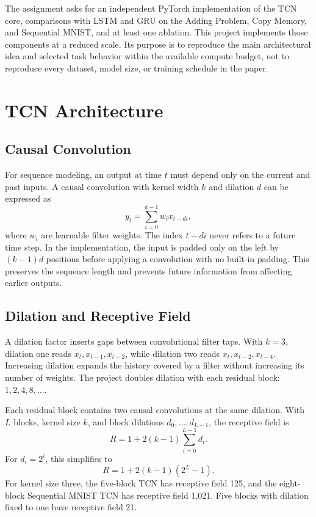 \documentclass[conference]{IEEEtran}
\begin{document}
The assignment asks for an independent PyTorch implementation of the TCN core, comparisons with LSTM and GRU on the Adding Problem, Copy Memory, and Sequential MNIST, and at least one ablation. This project implements those components at a reduced scale. Its purpose is to reproduce the main architectural idea and selected task behavior within the available compute budget, not to reproduce every dataset, model size, or training schedule in the paper.

\section{TCN Architecture}
\subsection{Causal Convolution}
For sequence modeling, an output at time $t$ must depend only on the current and past inputs. A causal convolution with kernel width $k$ and dilation $d$ can be expressed as
\begin{equation}
y_t = \sum_{i=0}^{k-1} w_i x_{t-di},
\label{eq:causal}
\end{equation}
where $w_i$ are learnable filter weights. The index $t-di$ never refers to a future time step. In the implementation, the input is padded only on the left by $(k-1)d$ positions before applying a convolution with no built-in padding. This preserves the sequence length and prevents future information from affecting earlier outputs.

\subsection{Dilation and Receptive Field}
A dilation factor inserts gaps between convolutional filter taps. With $k=3$, dilation one reads $x_t,x_{t-1},x_{t-2}$, while dilation two reads $x_t,x_{t-2},x_{t-4}$. Increasing dilation expands the history covered by a filter without increasing its number of weights. The project doubles dilation with each residual block: $1,2,4,8,\ldots$.

Each residual block contains two causal convolutions at the same dilation. With $L$ blocks, kernel size $k$, and block dilations $d_0,\ldots,d_{L-1}$, the receptive field is
\begin{equation}
R = 1 + 2(k-1)\sum_{i=0}^{L-1}d_i.
\label{eq:rf_general}
\end{equation}
For $d_i=2^i$, this simplifies to
\begin{equation}
R = 1 + 2(k-1)(2^L-1).
\label{eq:rf_exp}
\end{equation}
For kernel size three, the five-block TCN has receptive field 125, and the eight-block Sequential MNIST TCN has receptive field 1,021. Five blocks with dilation fixed to one have receptive field 21.
\end{document}
